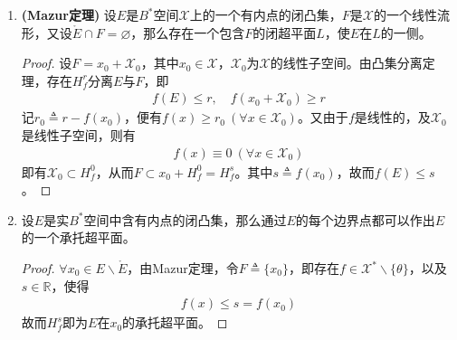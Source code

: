\begin{enumerate}[leftmargin=2cm, label=\arabic*]
    \item \textbf{(Mazur定理)} 设$E$是$B^*$空间$\mathscr{X}$上的一个有内点的闭凸集，$F$是$\mathscr{X}$的一个线性流形，又设$\mathring{E}\cap F=\varnothing$，那么存在一个包含$F$的闭超平面$L$，使$E$在$L$的一侧。
    \begin{proof}
        设$F = x_0+\mathscr{X}_0$，其中$x_0\in\mathscr{X}$，$\mathscr{X}_0$为$\mathscr{X}$的线性子空间。由凸集分离定理，存在$H_f^r$分离$E$与$F$，即
        \begin{align*}
            f(E)\leqslant r,\quad f(x_0+\mathscr{X}_0) \geqslant r
        \end{align*}
        记$r_0\triangleq r - f(x_0)$，便有$f(x)\geqslant r_0\ (\forall x\in \mathscr{X}_0)$。又由于$f$是线性的，及$\mathscr{X}_0$是线性子空间，则有
        \begin{align*}
            f(x) \equiv 0 \ (\forall x\in\mathscr{X}_0)
        \end{align*}
        即有$\mathscr{X}_0 \subset H_f^0$，从而$F\subset x_0+H_f^0 = H_f^s$。其中$s \triangleq f(x_0)$，故而$f(E)\leqslant s$。
    \end{proof}

    \item 设$E$是实$B^*$空间中含有内点的闭凸集，那么通过$E$的每个边界点都可以作出$E$的一个承托超平面。
    \begin{proof}
        $\forall x_0\in E\backslash \mathring{E}$，由Mazur定理，令$F\triangleq \{x_0\}$，即存在$f\in\mathscr{X}^*\backslash\{\theta\}$，以及$s\in\mathbb{R}$，使得
        \begin{align*}
            f(x) \leqslant s = f(x_0)
        \end{align*}
        故而$H_f^s$即为$E$在$x_0$的承托超平面。
    \end{proof}
\end{enumerate}


